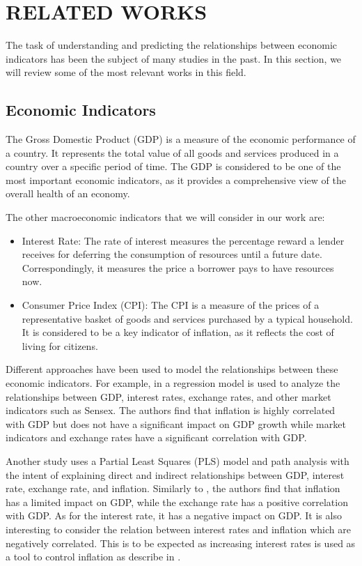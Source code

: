 \section{RELATED WORKS}
\label{sec:related_works}
The task of understanding and predicting the relationships between economic indicators has been the subject of many studies in the past. In this section, we will review some of the most relevant works in this field.

\subsection*{Economic Indicators}
\label{subsec:economic_indicators}
The Gross Domestic Product (GDP) is a measure of the economic performance of a country. It represents the total value of all goods and services produced in a country over a specific period of time. The GDP is considered to be one of the most important economic indicators, as it provides a comprehensive view of the overall health of an economy.

The other macroeconomic indicators that we will consider in our work are:
\begin{itemize}
  \item Interest Rate: The rate of interest measures the percentage reward a lender receives for deferring the consumption of resources until a future date. Correspondingly, it measures the price a borrower pays to have resources now.
  \item Consumer Price Index (CPI): The CPI is a measure of the prices of a representative basket of goods and services purchased by a typical household. It is considered to be a key indicator of inflation, as it reflects the cost of living for citizens.
\end{itemize}

Different approaches have been used to model the relationships between these economic indicators. For example, in \cite{gdp_early} a regression model is used to analyze the relationships between GDP, interest rates, exchange rates, and other market indicators such as Sensex. The authors find that inflation is highly correlated with GDP but does not have a significant impact on GDP growth while market indicators and exchange rates have a significant correlation with GDP.

Another study \cite{gdp_regr} uses a Partial Least Squares (PLS) model and path analysis with the intent of explaining direct and indirect relationships between GDP, interest rate, exchange rate, and inflation. Similarly to \cite{gdp_early}, the authors find that inflation has a limited impact on GDP, while the exchange rate has a positive correlation with GDP. As for the interest rate, it has a negative impact on GDP. It is also interesting to consider the relation between interest rates and inflation which are negatively correlated. This is to be expected as increasing interest rates is used as a tool to control inflation as describe in \cite{imf}.
